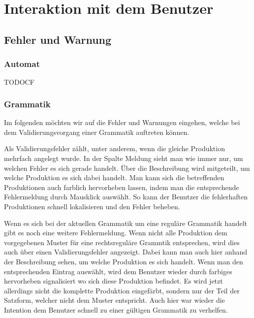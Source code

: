 

\chapter{Interaktion mit dem Benutzer}\label{Interaction}


\section{Fehler und Warnung}


\subsection{Automat}

TODOCF


\subsection{Grammatik}

Im folgenden möchten wir auf die Fehler und Warnungen eingehen, welche bei dem
Validierungsvorgang einer Grammatik auftreten können.\vspace{10pt}

Als Validierungsfehler zählt, unter anderem, wenn die gleiche Produktion mehrfach
angelegt wurde. In der Spalte Meldung sieht man wie immer nur, um welchen Fehler
es sich gerade handelt. Über die Beschreibung wird mitgeteilt, um welche
Produktion es sich dabei handelt. Man kann sich die betreffenden Produktionen
auch farblich hervorheben lassen, indem man die entsprechende Fehlermeldung durch
Mausklick auswählt. So kann der Benutzer die fehlerhaften Produktionen schnell
lokalisieren und den Fehler beheben.\vspace{10pt}

Wenn es sich bei der aktuellen Grammatik um eine reguläre Grammatik handelt
gibt es noch eine weitere Fehlermeldung. Wenn nicht alle Produktion dem
vorgegebenen Muster für eine rechtsreguläre Grammtik entsprechen, wird dies auch
über einen Validierungsfehler angezeigt. Dabei kann man auch hier anhand der
Beschreibung sehen, um welche Produktion es sich handelt. Wenn man den
entsprechenden Eintrag auswählt, wird dem Benutzer wieder durch farbiges
hervorheben signalisiert wo sich diese Produktion befindet. Es wird jetzt
allerdings nicht die komplette Produktion eingefärbt, sondern nur der Teil der
Satzform, welcher nicht dem Muster entspricht. Auch hier war wieder die
Intention dem Benutzer schnell zu einer gültigen Grammatik zu
verhelfen.\vspace{10pt}

